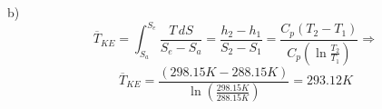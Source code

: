b) \\
\[
\overline{T}_{KE} = \int_{S_a}^{S_e} \frac{T \, dS}{S_e - S_a} = \frac{h_2 - h_1}{S_2 - S_1} = \frac{C_p (T_2 - T_1)}{C_p \left( \ln \frac{T_2}{T_1} \right)} \Rightarrow
\]
\[
\overline{T}_{KE} = \frac{(298.15K - 288.15K)}{\ln \left( \frac{298.15K}{288.15K} \right)} = 293.12K
\]